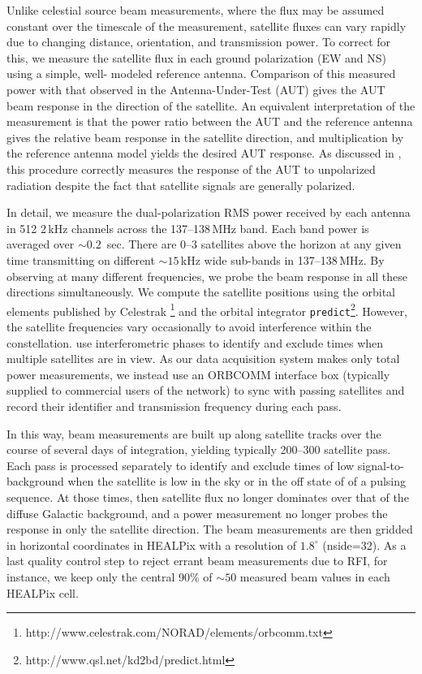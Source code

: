 \documentclass{emulateapj}
\begin{document}
Unlike celestial source beam measurements, where the flux may be 
assumed constant over the timescale of the measurement, satellite fluxes can vary rapidly 
due to changing distance, orientation, and transmission power. To correct for this, we 
measure the satellite flux in each ground polarization (EW and NS) using a simple, well-
modeled reference antenna. Comparison of this measured power with that observed in the 
Antenna-Under-Test (AUT) gives the AUT beam response in the direction of the satellite. 
An equivalent interpretation of the measurement is that the power ratio between the AUT and the reference 
antenna gives the relative beam response in the satellite direction, and multiplication by 
the reference antenna model yields the desired AUT response. As discussed in 
\citet{neben15}, this procedure correctly measures the response of the AUT to unpolarized radiation
 despite the fact that satellite signals are generally polarized.

In detail, we measure the dual-polarization RMS power received by each antenna in 512 2\,kHz 
channels across the 137--138\,MHz band. Each band power is averaged over $\sim0.2$
\,sec. There are 0--3 satellites above the horizon at any given time transmitting on different 
$\sim15$\,kHz wide sub-bands in 137--138\,MHz. By observing at many different 
frequencies, we probe the beam response in all these directions simultaneously. We 
compute the satellite positions using the orbital elements published by Celestrak
\footnote{http://www.celestrak.com/NORAD/elements/orbcomm.txt} and the orbital 
integrator \texttt{predict}\footnote{http://www.qsl.net/kd2bd/predict.html}. However, the 
satellite frequencies vary occasionally to avoid interference within the constellation. 
\citet{zheng14} use interferometric phases to identify and exclude times when multiple 
satellites are in view. As our data acquisition system makes only total power 
measurements, we instead use an ORBCOMM interface box (typically supplied to 
commercial users of the network) to sync with passing satellites and record their identifier 
and transmission frequency during each pass.

In this way, beam measurements are built up along satellite tracks over the course of 
several days of integration, yielding typically 200--300 satellite pass. Each pass is 
processed separately to identify and exclude times of low signal-to-background when the 
satellite is low in the sky or in the off state of of a pulsing sequence. At those times, then 
satellite flux no longer dominates over that of the diffuse Galactic background, and a 
power measurement no longer probes the response in only the satellite direction. The beam 
measurements are then gridded in horizontal coordinates in HEALPix \citep{healpix} with a resolution of 
$1.8^\circ$ (nside=32). As a last quality control step to reject errant beam measurements 
due to RFI, for instance, we keep only the central 90\% of $\sim50$ measured beam 
values in each HEALPix cell.
\end{document}
